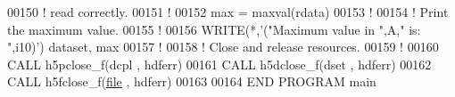 \begin{DoxyCode}
00150   \textcolor{comment}{! read correctly.}
00151   \textcolor{comment}{!}
00152   max = maxval(rdata)
00153   \textcolor{comment}{!}
00154   \textcolor{comment}{! Print the maximum value.}
00155   \textcolor{comment}{!}
00156   \textcolor{keyword}{WRITE}(*,\textcolor{stringliteral}{'("Maximum value in ",A," is: ",i10)'}) dataset, max
00157   \textcolor{comment}{!}
00158   \textcolor{comment}{! Close and release resources.}
00159   \textcolor{comment}{!}
00160   \textcolor{keyword}{CALL }h5pclose\_f(dcpl , hdferr)
00161   \textcolor{keyword}{CALL }h5dclose\_f(dset , hdferr)
00162   \textcolor{keyword}{CALL }h5fclose\_f(\hyperlink{structfile}{file} , hdferr)
00163 
00164 \textcolor{keyword}{END PROGRAM }main
\end{DoxyCode}
